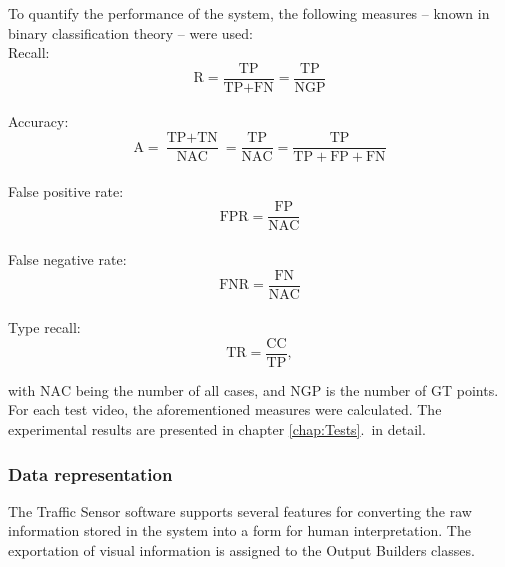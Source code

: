 To quantify the performance of the system, the following measures -- known in binary classification theory -- were used:
\\[5pt]
\noindent Recall:
\begin{displaymath}
\text{R} = \frac{\text{TP}}{\text{TP}+\text{FN}} = \frac{\text{TP}}{\text{NGP}}
\end{displaymath}
\\[5pt]
\noindent Accuracy:
\begin{displaymath}
\text{A} = \frac{\text{TP}+\text{TN}}{\text{NAC}} = \frac{\text{TP}}{\text{NAC}} = \frac{\text{TP}}{\text{TP}+\text{FP}+\text{FN}}
\end{displaymath}
\\[5pt]
\noindent False positive rate:
\begin{displaymath}
\text{FPR} = \frac{\text{FP}}{\text{NAC}}
\end{displaymath}
\\[5pt]
\noindent False negative rate:
\begin{displaymath}
\text{FNR} = \frac{\text{FN}}{\text{NAC}}
\end{displaymath}
\\[5pt]
\noindent Type recall:
\begin{displaymath}
\text{TR} = \frac{\text{CC}}{\text{TP}},
\end{displaymath}

with $\text{NAC}$ being the number of all cases, and $\text{NGP}$ is the number of GT points.
For each test video, the aforementioned measures were calculated.
The experimental results are presented in chapter \ref{chap:Tests}.~in detail.
\subsubsection{Data representation}
The Traffic Sensor software supports several features for converting the raw information stored in the system into a form for human interpretation.
The exportation of visual information is assigned to the Output Builders classes.

